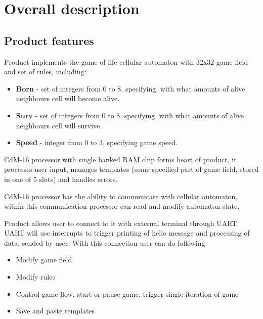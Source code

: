 \chapter*{Overall description}

\section*{Product features}

Product implements the game of life cellular automaton with 32x32 game field and set of rules, including:

\begin{itemize}
	\item \textbf{Born} - set of integers from 0 to 8, specifying, with what amounts of alive neighbours cell will become alive.
	\item \textbf{Surv} - set of integers from 0 to 8, specifying, with what amounts of alive neighbours cell will survive.
	\item \textbf{Speed} - integer from 0 to 3, specifying game speed.
\end{itemize}

CdM-16 processor with single banked RAM chip forms heart of product, it processes user input, manages templates (some specified part of game field, stored in one of 5 slots) and handles errors.

CdM-16 processor has the ability to communicate with cellular automaton, within this communication processor can read and modify automaton state.

Product allows user to connect to it with external terminal through UART. UART will use interrupts to trigger printing of hello message and processing of data, sended by user. With this connection user can do following:

\begin{itemize}
	\item Modify game field
	\item Modify rules
	\item Control game flow, start or pause game, trigger single iteration of game
	\item Save and paste templates
\end{itemize}

